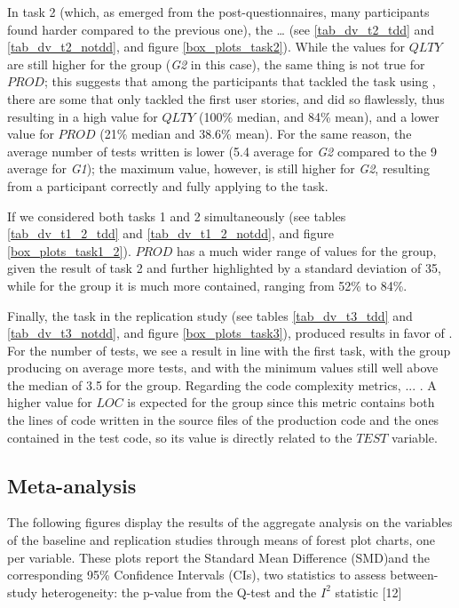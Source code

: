 In task 2 (which, as emerged from the post-questionnaires, many participants found harder compared to the previous one), the \dots
(see \ref{tab_dv_t2_tdd} and \ref{tab_dv_t2_notdd}, and figure \ref{box_plots_task2}).
While the values for $QLTY$ are still higher for the \tdd group (\textit{G2} in this case), the same thing is not true for $PROD$; this suggests that among the participants that tackled the task using \tdd, there are some that only tackled the first user stories, and did so flawlessly, thus resulting in a high value for $QLTY$ (100\% median, and 84\% mean), and a lower value for $PROD$ (21\% median and 38.6\% mean). 
For the same reason, the average number of tests written is lower (5.4 average for \textit{G2} compared to the 9 average for \textit{G1}); the maximum value, however, is still higher for \textit{G2}, resulting from a participant correctly and fully applying \tdd to the task.

If we considered both tasks 1 and 2 simultaneously (see tables \ref{tab_dv_t1_2_tdd} and \ref{tab_dv_t1_2_notdd}, and figure \ref{box_plots_task1_2}).
$PROD$ has a much wider range of values for the \tdd group, given the result of task 2 and further highlighted by a standard deviation of 35, while for the \notdd group it is much more contained, ranging from 52\% to 84\%.

Finally, the task in the replication study (see tables \ref{tab_dv_t3_tdd} and \ref{tab_dv_t3_notdd}, and figure \ref{box_plots_task3}), produced results in favor of \tdd.
For the number of tests, we see a result in line with the first task, with the \tdd group producing on average more tests, and with the minimum values still well above the median of 3.5 for the \notdd group.
Regarding the code complexity metrics, ... . A higher value for $LOC$ is expected for the \tdd group since this metric contains both the lines of code written in the source files of the production code and the ones contained in the test code, so its value is directly related to the $TEST$ variable.



\subsection{Meta-analysis}
The following figures display the results of the aggregate analysis on the variables of the baseline and replication studies through means of forest plot charts, one per variable. These plots report the Standard Mean Difference (SMD)and the corresponding 95\% Confidence Intervals (CIs), two statistics to assess between-study heterogeneity: the p-value from the Q-test and the $I^2$ statistic [12]  


